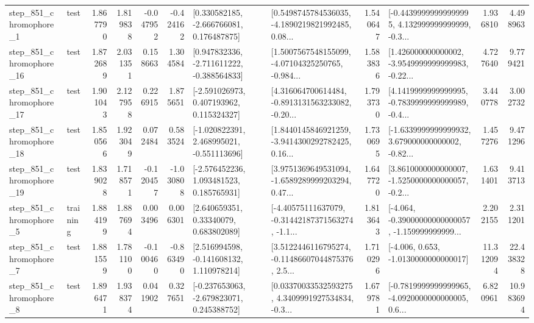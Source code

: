 \begin{tabular}{llrrrrllrlrr}
   step\_851\_chromophore\_1 &      test &      1.867790 &    1.819838 &     -0.047952 & -0.424162 &    [0.330582185, -2.666766081, 0.176487875] &  [0.5498745784536035, -4.1890219821992485, 0.08... &       1.540647 &  [-0.44399999999999995, 4.132999999999999, -0.3... &            1.936810 &          4.498963 \\
  step\_851\_chromophore\_16 &      test &      1.872689 &    2.031351 &      0.158663 &  1.304584 &   [0.947832336, -2.711611222, -0.388564833] &  [1.5007567548155099, -4.07104325250765, -0.984... &       1.583836 &  [1.426000000000002, -3.9549999999999983, -0.22... &            4.727640 &          9.779421 \\
  step\_851\_chromophore\_17 &      test &      1.901043 &    2.127958 &      0.226915 &  1.875651 &    [-2.591026973, 0.407193962, 0.115324327] &  [4.316064700614484, -0.8913131563233082, -0.20... &       1.793730 &  [4.1419999999999995, -0.7839999999999989, -0.4... &            3.440778 &          3.002732 \\
  step\_851\_chromophore\_18 &      test &      1.850566 &    1.923049 &      0.072484 &  0.583524 &   [-1.020822391, 2.468995021, -0.551113696] &  [1.8440145846921259, -3.9414300292782425, 0.16... &       1.730695 &  [-1.6339999999999932, 3.679000000000002, -0.82... &            1.457276 &          9.471296 \\
  step\_851\_chromophore\_19 &      test &      1.839028 &    1.718571 &     -0.120457 & -1.030808 &    [-2.576452236, 1.093481523, 0.185765931] &  [3.9751369649531094, -1.6589289999203294, 0.47... &       1.647720 &  [3.8610000000000007, -1.5250000000000057, -0.2... &            1.631401 &          9.413713 \\
   step\_851\_chromophore\_5 &  training &      1.884199 &    1.887694 &      0.003496 &  0.006301 &      [2.640659351, 0.33340079, 0.683802089] &  [-4.40575111637079, -0.31442187371563274, -1.1... &       1.813643 &  [-4.064, -0.39000000000000057, -1.159999999999... &            2.202155 &          2.311201 \\
   step\_851\_chromophore\_7 &      test &      1.881559 &    1.781100 &     -0.100460 & -0.863490 &    [2.516994598, -0.141608132, 1.110978214] &  [3.5122446116795274, -0.11486607044875376, 2.5... &       1.710296 &               [-4.006, 0.653, -1.0130000000000017] &           11.312094 &         22.438328 \\
   step\_851\_chromophore\_8 &      test &      1.896471 &    1.938374 &      0.041902 &  0.327651 &   [-0.237653063, -2.679823071, 0.245388752] &  [0.03370033532593275, 4.3409991927534834, -0.3... &       1.679781 &  [-0.7819999999999965, -4.0920000000000005, 0.6... &            6.820961 &         10.983694 \\

\end{tabular}
